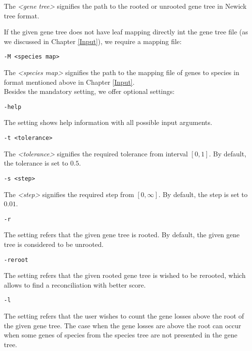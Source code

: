 \documentclass[12pt,a4paper,oneside]{book}
\begin{document}
The \emph{<gene tree>} signifies the path to the rooted or unrooted gene tree in Newick tree format.

If the given gene tree does not have leaf mapping directly int the gene tree file (as we discussed in Chapter \ref{Input}), we require a mapping file: 

\begin{verbatim}-M <species map>
\end{verbatim}

The \emph{<species map>} signifies the path to the mapping file of genes to species in format mentioned above in Chapter \ref{Input}.
\\

Besides the mandatory setting, we offer optional settings:

\begin{verbatim}-help
\end{verbatim}

The setting shows help information with all possible input arguments.

\begin{verbatim}-t <tolerance>
\end{verbatim}

The \emph{<tolerance>} signifies the required tolerance from interval $[ 0, 1 ]$. By default, the tolerance is set to $0.5$.

\begin{verbatim}-s <step>
\end{verbatim}

The \emph{<step>} signifies the required step from $[0, \infty]$. By default, the step is set to $0.01$.

\begin{verbatim}-r
\end{verbatim}

The setting refers that the given gene tree is rooted. By default, the given gene tree is considered to be unrooted.

\begin{verbatim}-reroot
\end{verbatim}

The setting refers that the given rooted gene tree is wished to be rerooted, which allows to find a reconciliation with better score.

\begin{verbatim}-l
\end{verbatim}

The setting refers that the user wishes to count the gene losses above the root of the given gene tree. The case when the gene losses are above the root can occur when some genes of species from the species tree are not presented in the gene tree.
\end{document}
